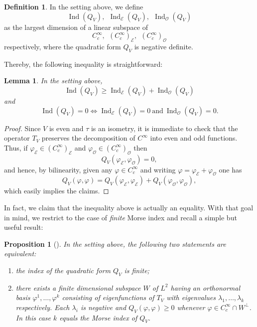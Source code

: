 \documentclass[10pt]{amsart}
\let\mathcal\mathscr
\newcounter{cas}
\DeclareMathOperator{\Ind}{Ind}
\newtheorem{lem}[thm]{Lemma}
\newtheorem{prop}[thm]{Proposition}
\theoremstyle{definition}
\newtheorem{definition}[thm]{Definition}
\begin{document}
\begin{definition}\label{def:index} In the setting above, we define
\[
\Ind(Q_V), \ \ \Ind_{\mathcal{E}} (Q_V), \ \ \Ind_{\mathcal{O}} (Q_V)
\]
as the largest dimension of a linear subspace of
\[
C^{\infty}_c, \ \ (C^{\infty}_c)_{\mathcal{E}}, \ \ (C^{\infty}_c)_{\mathcal{O}}
\]
respectively, where the quadratic form $Q_V$ is negative definite.
\end{definition}

Thereby, the following inequality is straightforward:

\begin{lem}\label{lem:ineq}
In the setting above,
\[
\Ind(Q_V) \geq \Ind_{\mathcal{E}} (Q_V)+\Ind_{\mathcal{O}} (Q_V)
\]
and
\[
\Ind(Q_V)=0 \iff \Ind_{\mathcal{E}} (Q_V)=0 \ \text{and} \ \Ind_{\mathcal{O}} (Q_V)=0.
\]
\end{lem}

\begin{proof} Since $V$ is even and $\tau$ is an isometry, it is immediate to check that the operator $T_V$ preserves the decomposition of $C^{\infty}$ into even and odd functions. Thus, if $\varphi_{\mathcal{E}}\in (C^{\infty}_c)_{\mathcal{E}}$ and $\varphi_{\mathcal{O}}\in (C^{\infty}_c)_{\mathcal{O}}$ then
\begin{equation}\label{eq:mixedprod}
Q_{V}(\varphi_{\mathcal{E}},\varphi_{\mathcal{O}})=0,
\end{equation}
and hence, by bilinearity, given any $\varphi\in C^{\infty}_c$ and writing $\varphi=\varphi_{\mathcal{E}}+\varphi_{\mathcal{O}}$ one has
\[
Q_{V}(\varphi,\varphi)=Q_{V}(\varphi_{\mathcal{E}},\varphi_{\mathcal{E}})+Q_{V}(\varphi_{\mathcal{O}},\varphi_{\mathcal{O}}),
\]
which easily implies the claims.
\end{proof}

In fact, we claim that the inequality above is actually an equality.
With that goal in mind, we restrict to the case of \emph{finite} Morse index and recall a simple but useful result:

\begin{prop}[{\cf \cite[Prop.\,2]{FC85}}]\label{pro:l2spec}
In the setting above, the following two statements are equivalent:
\begin{enumerate}
\item{the index of the quadratic form $Q_V$ is finite;}
\item{there exists a finite dimensional subspace $W$ of $L^2$ having an orthonormal basis $\varphi^1,\ldots,\varphi^k$ consisting of eigenfunctions of $T_V$ with eigenvalues $\lambda_1,\ldots,\lambda_k$ respectively. Each $\lambda_i$ is negative and $Q_V(\varphi,\varphi)\geq 0$ whenever $\varphi\in C^{\infty}_c\cap W^{\perp}$. In this case $k$ equals the Morse index of $Q_V$.}
\end{enumerate}
\end{prop}
\end{document}
